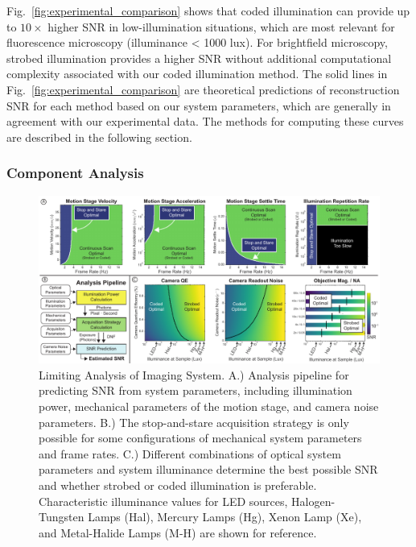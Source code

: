 Fig.~\ref{fig:experimental_comparison} shows that coded illumination can provide up to $10\times$ higher SNR in low-illumination situations, which are most relevant for fluorescence microscopy (illuminance < 1000 lux). For brightfield microscopy, strobed illumination provides a higher SNR without additional computational complexity associated with our coded illumination method. The solid lines in Fig.~\ref{fig:experimental_comparison} are theoretical predictions of reconstruction SNR for each method based on our system parameters, which are generally in agreement with our experimental data. The methods for computing these curves are described in the following section.

\subsubsection{Component Analysis}\label{sec:highthroughput:component_analysis}

\begin{figure}
  \centering
    \includegraphics[width=1.0\textwidth]{figures/fig_highthroughput_component_analysis.pdf}
      \caption{\label{fig:component_analysis} Limiting Analysis of Imaging System. A.) Analysis pipeline for predicting SNR from system parameters, including illumination power, mechanical parameters of the motion stage, and camera noise parameters. B.) The stop-and-stare acquisition strategy is only possible for some configurations of mechanical system parameters and frame rates. C.) Different combinations of optical system parameters and system illuminance determine the best possible SNR and whether strobed or coded illumination is preferable. Characteristic illuminance values for LED sources, Halogen-Tungsten Lamps (Hal), Mercury Lamps (Hg), Xenon Lamp (Xe), and Metal-Halide Lamps (M-H) are shown for reference. }
\end{figure}

